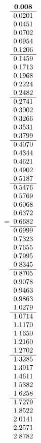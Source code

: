 =\hbox{$\begin{array}{c}
\bf 0.008 
 \\ \hline 
  0.0201 \\ 
  0.0451 \\ 
  0.0702 \\ 
  0.0954 \\ 
  0.1206
 \\ \hline 
  0.1459 \\ 
  0.1713 \\ 
  0.1968 \\ 
  0.2224 \\ 
  0.2482
 \\ \hline 
  0.2741 \\ 
  0.3002 \\ 
  0.3266 \\ 
  0.3531 \\ 
  0.3799
 \\ \hline 
  0.4070 \\ 
  0.4344 \\ 
  0.4621 \\ 
  0.4902 \\ 
  0.5187
 \\ \hline 
  0.5476 \\ 
  0.5769 \\ 
  0.6068 \\ 
  0.6372 \\ 
  0.6682
 \\ \hline 
  0.6999 \\ 
  0.7323 \\ 
  0.7655 \\ 
  0.7995 \\ 
  0.8345
 \\ \hline 
  0.8705 \\ 
  0.9078 \\ 
  0.9463 \\ 
  0.9863 \\ 
  1.0279
 \\ \hline 
  1.0714 \\ 
  1.1170 \\ 
  1.1650 \\ 
  1.2160 \\ 
  1.2702
 \\ \hline 
  1.3285 \\ 
  1.3917 \\ 
  1.4611 \\ 
  1.5382 \\ 
  1.6258
 \\ \hline 
  1.7279 \\ 
  1.8522 \\ 
  2.0141 \\ 
  2.2571 \\ 
  2.8782
 \end{array}$}
